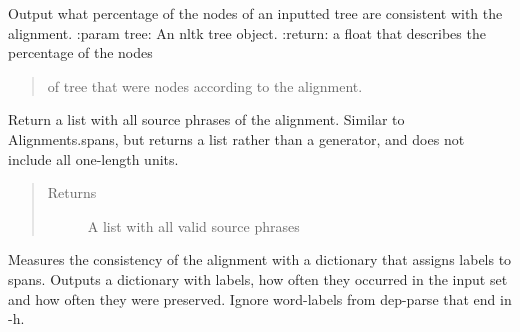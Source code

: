 \documentclass[letterpaper,10pt,english]{sphinxmanual}
\begin{document}
\begin{fulllineitems}
\begin{fulllineitems}
\end{fulllineitems}


\begin{fulllineitems}
\label{alignments:alignments.Alignments.agreement}
Output what percentage of the nodes of an inputted tree
are consistent with the alignment.
:param tree:            An nltk tree object.
:return:        a float that describes the percentage of the nodes
\begin{quote}

of tree that were nodes according to the alignment.
\end{quote}

\end{fulllineitems}


\begin{fulllineitems}
\label{alignments:alignments.Alignments.compute_phrases}
Return a list with all source phrases of the alignment.
Similar to Alignments.spans, but returns a list rather
than a generator, and does not include all one-length units.
\begin{quote}\begin{description}
\item[{Returns}] \leavevmode
A list with all valid source phrases

\end{description}\end{quote}

\end{fulllineitems}


\begin{fulllineitems}
\label{alignments:alignments.Alignments.consistent_labels}
Measures the consistency of the alignment with a dictionary
that assigns labels to spans.
Outputs a dictionary with labels, how often
they occurred in the input set and how often they were preserved.
Ignore word-labels from dep-parse that end in -h.

\end{fulllineitems}


\end{fulllineitems}
\end{document}
